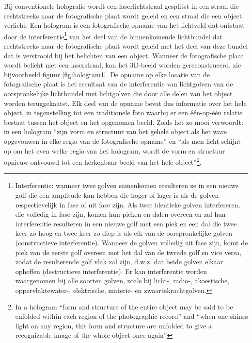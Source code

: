 \documentclass[
  11pt,
]{book}
\begin{document}
Bij conventionele holografie wordt een laserlichtstraal gesplitst in een straal die rechtstreeks naar de fotografische plaat wordt geleid en een straal die een object verlicht. Een hologram is een fotografische opname van het lichtveld dat ontstaat door de interferentie\footnote{Interferentie: wanneer twee golven samenkomen resulteren ze in een nieuwe golf die een amplitude kan hebben die hoger of lager is als de golven respectievelijk in fase of uit fase zijn. Als twee identieke golven interfereren, die volledig in fase zijn, komen hun pieken en dalen overeen en zal hun interferentie resulteren in een nieuwe golf met een piek en een dal die twee keer zo hoog en twee keer zo diep is als elk van de oorspronkelijke golven (constructieve interferentie). Wanneer de golven volledig uit fase zijn, komt de piek van de eerste golf overeen met het dal van de tweede golf en vice versa, zodat de resulterende golf vlak zal zijn, d.w.z. dat beide golven elkaar opheffen (destructieve interferentie). Er kan interferentie worden waargenomen bij alle soorten golven, zoals bij licht-, radio-, akoestische, oppervlaktewater-, elektrische, materie- en zwaartekrachtgolven.} van het deel van de binnenkomende lichtbundel dat rechtstreeks naar de fotografische plaat wordt geleid met het deel van deze bundel dat is verstrooid bij het belichten van een object. Wanneer de fotografische plaat wordt belicht met een laserstraal, kan het 3D-beeld worden gereconstrueerd, zie bijvoorbeeld figuur \ref{fig:hologram1}. De opname op elke locatie van de fotografische plaat is het resultaat van de interferentie van lichtgolven van de oorspronkelijke lichtbundel met lichtgolven die door alle delen van het object worden teruggekaatst. Elk deel van de opname bevat dus informatie over het hele object, in tegenstelling tot een traditionele foto waarbij er een één-op-één relatie bestaat tussen het object en het opgenomen beeld. Zoals \citet{bohm1980} het zo mooi verwoordt: in een hologram ``zijn vorm en structuur van het gehele object als het ware opgevouwen in elke regio van de fotografische opname'' en ``als men licht schijnt op om het even welke regio van het hologram, wordt de vorm en structuur opnieuw ontvouwd tot een herkenbaar beeld van het hele object''\footnote{In a hologram ``form and structure of the entire object may be said to be enfolded within each region of the photographic record'' and ``when one shines light on any region, this form and structure are unfolded to give a recognizable image of the whole object once again''}.
\end{document}
